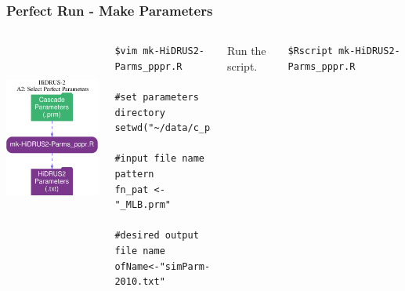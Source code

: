 \documentclass[aspectratio=169]{beamer}
\begin{document}
\begin{frame}[fragile]
\frametitle{Perfect Run - Make Parameters}

\begin{columns}

\includegraphics[height=2.5in, width=2in]{../fig/perf_prm.pdf}

\begin{lstlisting}[style=BashInputStyle] 
$vim mk-HiDRUS2-Parms_pppr.R

#set parameters directory
setwd("~/data/c_parms_dbz/")

#input file name pattern
fn_pat <- "_MLB.prm"  

#desired output file name
ofName<-"simParm-2010.txt"
\end{lstlisting}

Run the script.
\begin{lstlisting}[style=BashInputStyle]
$Rscript mk-HiDRUS2-Parms_pppr.R 
\end{lstlisting}
\end{columns}

\end{frame}
%
%
%
%
%
%
%
\end{document}
